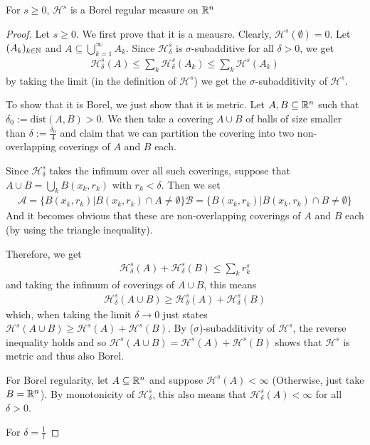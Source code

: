 \begin{thm}[]
For $s \geq 0$, $\mathcal{H}^{s}$ is a Borel regular measure on $\mathbb{R}^{n}$
\end{thm}
\begin{proof}
  Let $s \geq 0$. 
  We first prove that it is a meausre.
  Clearly, $\mathcal{H}^{s}(\emptyset) = 0$.
  Let $(A_k)_{k \in \mathbb{N}}$ and $A \subseteq \bigcup_{k=1}^{\infty}A_k$.
  Since $\mathcal{H}_{\delta}^{s}$ is $\sigma$-subadditive for all $\delta > 0$, we get
  \begin{align*}
    \mathcal{H}_{\delta}^{s}(A)\leq \sum_{k}\mathcal{H}_{\delta}^{s}(A_k) \leq \sum_{k}\mathcal{H}^{s}(A_k)
  \end{align*}
  by taking the limit (in the definition of $\mathcal{H}^{s}$) we get the $\sigma$-subadditivity of $\mathcal{H}^{s}$.

  To show that it is Borel, we just show that it is metric.
  Let $A,B \subseteq \mathbb{R}^{n}$ such that $\delta_0 := \text{dist}(A,B) > 0$.
  We then take a covering $A \cup B$ of balls of size smaller than $\delta := \tfrac{\delta_0}{4}$ and claim that we can partition the covering into two non-overlapping coverings of $A$ and $B$ each.


  Since $\mathcal{H}_{\delta}^{s}$ takes the infimum over all such coverings, suppose that $A \cup B = \bigcup_{k}B(x_k,r_k)$ with $r_k < \delta$.
  Then we set
  \begin{align*}
    \mathcal{A} = \{B(x_k,r_k) \big\vert B(x_k,r_k) \cap A \neq \emptyset\}
    \mathcal{B} = \{B(x_k,r_k) \big\vert B(x_k,r_k) \cap B \neq \emptyset\}
  \end{align*}
  And it becomes obvious that 
  these are non-overlapping coverings of $A$ and $B$ each (by using the triangle inequality).

  Therefore, we get
  \begin{align*}
    \mathcal{H}_{\delta}^{s}(A) + \mathcal{H}_{\delta}^{s}(B) \leq \sum_{k}r_k^{s}
  \end{align*}
  and taking the infimum of coverings of $A \cup B$, this means
  \begin{align*}
    \mathcal{H}_{\delta}^{s}(A \cup B) \geq \mathcal{H}_{\delta}^{s}(A) + \mathcal{H}_{\delta}^{s}(B) 
  \end{align*}
  which, when taking the limit $\delta \to 0$ just states $\mathcal{H}^{s}(A \cup B) \geq \mathcal{H}^{s}(A) + \mathcal{H}^{s}(B)$.
  By ($\sigma$)-subadditivity of $\mathcal{H}^{s}$, the reverse inequality holds and so $\mathcal{H}^{s}(A \cup B) = \mathcal{H}^{s}(A) + \mathcal{H}^{s}(B)$ shows that $\mathcal{H}^{s}$ is metric and thus also Borel.

  For Borel regularity, let $A \subseteq \mathbb{R}^{n}$ and suppose $\mathcal{H}^{s}(A) < \infty$ (Otherwise, just take $B = \mathbb{R}^{n}$).
  By monotonicity of $\mathcal{H}_{\delta}^{s}$, this also means that $\mathcal{H}_{\delta}^{s}(A) < \infty$ for all $\delta > 0$.

  For $\delta = \tfrac{1}{l}$ 



\end{proof}

